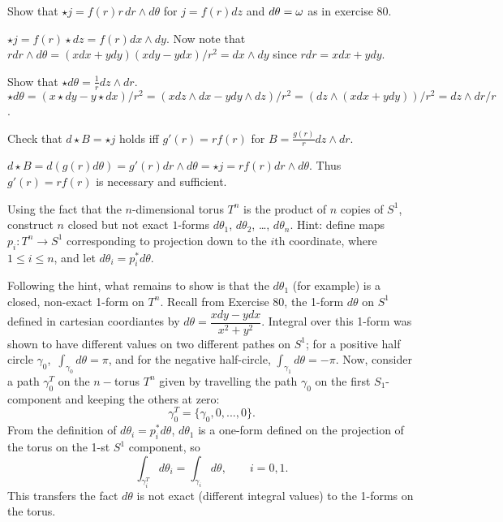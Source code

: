 \begin{p}%
{Show that $\star j=f(r)r\,dr\wedge d\theta$ for $j=f(r)dz$ and $d\theta=\omega$ as in exercise 80.}
\end{p}
{$\star j=f(r)\star dz=f(r)dx\wedge dy$. Now note that $r dr\wedge d\theta=(xdx+ydy)(xdy-ydx)/r^2=dx\wedge dy$ since $r dr=xdx+ydy$.}

\begin{p}%
{Show that $\star d\theta=\frac{1}{r}dz\wedge dr$.}{$\star d\theta=(x\star dy-y\star dx)/r^2=(xdz\wedge dx-ydy\wedge dz)/r^2=(dz\wedge(xdx+ydy))/r^2=dz\wedge dr/r$.}
\end{p}

\begin{p}%
{Check that $d\star B=\star j$ holds iff $g'(r)=rf(r)$ for $B=\frac{g(r)}{r} dz\wedge dr$.}
\end{p}
{$d\star B=d(g(r)d\theta)=g'(r)dr\wedge d\theta=\star j=rf(r)dr\wedge d\theta.$ Thus $g'(r)=rf(r)$ is necessary and sufficient.}

\begin{p}%
Using the fact that the $n$-dimensional torus $T^n$ is the product of $n$ copies of $S^1$, construct $n$ closed but not exact $1$-forms $d\theta_1$, $d\theta_2$, \dots, $d\theta_n$. Hint: define maps $p_i:T^n\to S^1$ corresponding to projection down to the $i$th coordinate, where $1\leq i\leq n$, and let $d\theta_i=p_i^*d\theta$.
\end{p}
{Following the hint, what remains to show is that the $d\theta_1$ (for example) is a closed, non-exact 1-form on $T^n$. Recall from Exercise 80, the 1-form $d\theta$ on $S^1$ defined in cartesian coordiantes by $d\theta = \dfrac{xdy-ydx}{x^2+y^2}$. Integral over this 1-form  was shown to have different values on two different pathes on $S^1$; for a positive half circle $\gamma_0$, $\,\int_{\gamma_0}d\theta = \pi$, and for the negative half-circle, $\int_{\gamma_1}d\theta = -\pi$.
Now, consider a path $\gamma_0^T$ on the $n-$torus $T^n$ given by travelling the path $\gamma_0$ on the first $S_1$-component and keeping the others at zero:
$$
\gamma_0^T = \{\gamma_0, 0, ..., 0\}.
$$
From the definition of $d\theta_i=p_i^*d\theta$, $d\theta_1$ is a one-form defined on the projection of the torus on the 1-st $S^1$ component, so 
$$ 
\int_{\gamma_i^T}d\theta_i = \int_{\gamma_i}d\theta, \qquad i=0,1.
$$
}
This transfers the fact $d\theta$ is not exact (different integral values) to the 1-forms on the torus. 

